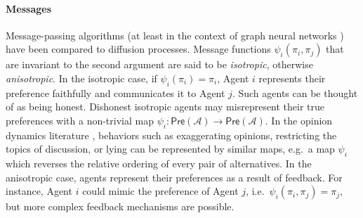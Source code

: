 \documentclass[conference]{ieeeconf}
\newcommand{\A}{\mathcal{A}}
\newcommand{\Pref}{\mathsf{Pre}}
\begin{document}
\paragraph{Messages}
Message-passing algorithms (at least in the context of graph neural networks \cite{tailor2021}) have been compared to diffusion processes. Message functions $\psi_i(\pi_i,\pi_j)$ that are invariant to the second argument are said to be \emph{isotropic}, otherwise \emph{anisotropic}. In the isotropic case, if $\psi_i(\pi_i) = \pi_i$, Agent $i$ represents their preference faithfully and communicates it to Agent $j$. Such agents can be thought of as being honest. Dishonest isotropic agents may misrepresent their true preferences with a non-trivial map $\psi_i: \Pref(\A) \to \Pref(\A)$. In the opinion dynamics literature \cite{hansen2021}, behaviors such as exaggerating opinions, restricting the topics of discussion, or lying can be represented by similar maps, e.g.~a map $\psi_i$ which reverses the relative ordering of every pair of alternatives.
In the anisotropic case, agents represent their preferences as a result of feedback. For instance, Agent $i$ could mimic the preference of Agent $j$, i.e.~$\psi_i(\pi_i,\pi_j) = \pi_j$, but more complex feedback mechanisms are possible.
\end{document}
